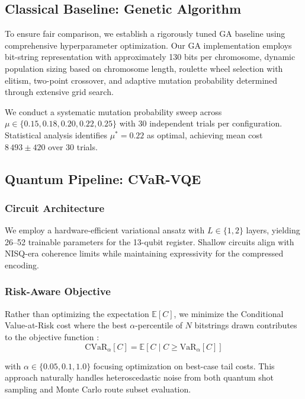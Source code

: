 \subsection{Classical Baseline: Genetic Algorithm}

To ensure fair comparison, we establish a rigorously tuned GA baseline using comprehensive hyperparameter optimization. Our GA implementation employs bit-string representation with approximately 130 bits per chromosome, dynamic population sizing based on chromosome length, roulette wheel selection with elitism, two-point crossover, and adaptive mutation probability determined through extensive grid search.

We conduct a systematic mutation probability sweep across $\mu \in \{0.15, 0.18, 0.20, 0.22, 0.25\}$ with 30 independent trials per configuration. Statistical analysis identifies $\mu^* = 0.22$ as optimal, achieving mean cost $8\,493 \pm 420$ over 30 trials.

\subsection{Quantum Pipeline: CVaR-VQE}

\subsubsection{Circuit Architecture}
We employ a hardware-efficient variational ansatz with $L \in \{1, 2\}$ layers, yielding 26--52 trainable parameters for the 13-qubit register. Shallow circuits align with NISQ-era coherence limits while maintaining expressivity for the compressed encoding.

\subsubsection{Risk-Aware Objective}
Rather than optimizing the expectation $\mathbb{E}[C]$, we minimize the Conditional Value-at-Risk cost where the best $\alpha$-percentile of $N$ bitstrings drawn contributes to the objective function \cite{barkoutsos_improving_2020}:
\begin{equation}
    \text{CVaR}_\alpha[C] = \mathbb{E}[C \mid C \geq \text{VaR}_\alpha[C]]
\end{equation}

with $\alpha \in \{0.05, 0.1, 1.0\}$ focusing optimization on best-case tail costs. This approach naturally handles heteroscedastic noise from both quantum shot sampling and Monte Carlo route subset evaluation.

